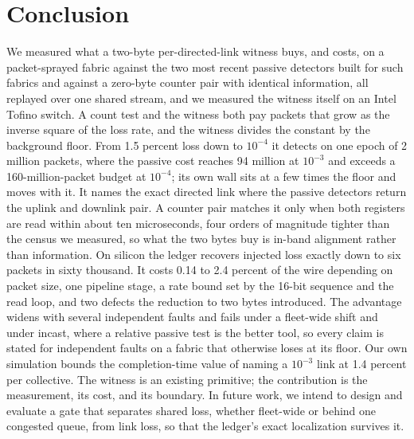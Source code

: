 \section{Conclusion}
\label{sec:conclusion}

We measured what a two-byte per-directed-link witness buys, and costs, on a packet-sprayed fabric against the two most recent passive detectors built for such fabrics and against a zero-byte counter pair with identical information, all replayed over one shared stream, and we measured the witness itself on an Intel Tofino switch. A count test and the witness both pay packets that grow as the inverse square of the loss rate, and the witness divides the constant by the background floor. From 1.5 percent loss down to $10^{-4}$ it detects on one epoch of 2 million packets, where the passive cost reaches 94 million at $10^{-3}$ and exceeds a 160-million-packet budget at $10^{-4}$; its own wall sits at a few times the floor and moves with it. It names the exact directed link where the passive detectors return the uplink and downlink pair. A counter pair matches it only when both registers are read within about ten microseconds, four orders of magnitude tighter than the census we measured, so what the two bytes buy is in-band alignment rather than information. On silicon the ledger recovers injected loss exactly down to six packets in sixty thousand. It costs 0.14 to 2.4 percent of the wire depending on packet size, one pipeline stage, a rate bound set by the 16-bit sequence and the read loop, and two defects the reduction to two bytes introduced. The advantage widens with several independent faults and fails under a fleet-wide shift and under incast, where a relative passive test is the better tool, so every claim is stated for independent faults on a fabric that otherwise loses at its floor. Our own simulation bounds the completion-time value of naming a $10^{-3}$ link at 1.4 percent per collective. The witness is an existing primitive; the contribution is the measurement, its cost, and its boundary. In future work, we intend to design and evaluate a gate that separates shared loss, whether fleet-wide or behind one congested queue, from link loss, so that the ledger's exact localization survives it.
